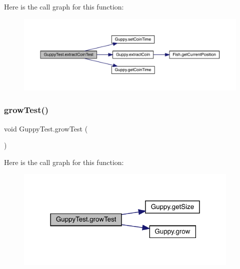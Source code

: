 Here is the call graph for this function\+:
\nopagebreak
\begin{figure}[H]
\begin{center}
\leavevmode
\includegraphics[width=350pt]{class_guppy_test_a1277dd581c572d4125b0599e144f726b_cgraph}
\end{center}
\end{figure}
\mbox{\label{class_guppy_test_aee7d947a05b64664dfdfd646325d3b8a}} 
\subsubsection{\texorpdfstring{grow\+Test()}{growTest()}}
{\footnotesize\ttfamily void Guppy\+Test.\+grow\+Test (\begin{DoxyParamCaption}{ }\end{DoxyParamCaption})\hspace{0.3cm}{\ttfamily [inline]}}

Here is the call graph for this function\+:
\nopagebreak
\begin{figure}[H]
\begin{center}
\leavevmode
\includegraphics[width=303pt]{class_guppy_test_aee7d947a05b64664dfdfd646325d3b8a_cgraph}
\end{center}
\end{figure}
\mbox{\label{class_guppy_test_a3f926a2bb6bae5ccb6e0ded7b53bfaa7}} 
